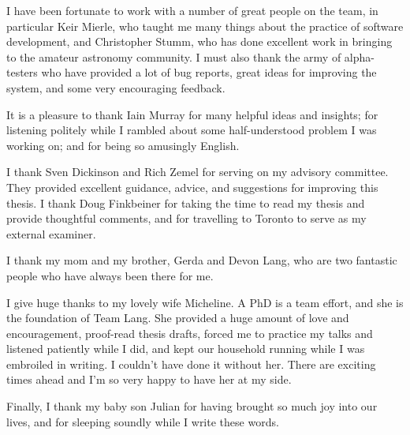\documentclass[letterpaper]{ut-thesis}
\begin{document}
\begin{preliminary}
\begin{acknowledgements}
I have been fortunate to work with a number of great people on the \an
team, in particular Keir Mierle, who taught me many things about the
practice of software development, and Christopher Stumm, who has done
excellent work in bringing \an to the amateur astronomy community.
I must also thank the army of alpha-testers who have provided a lot of
bug reports, great ideas for improving the system, and some very
encouraging feedback.




It is a pleasure to thank Iain Murray for many helpful ideas and
insights; for listening politely while I rambled about some
half-understood problem I was working on; and for being so amusingly
English.


I thank Sven Dickinson and Rich Zemel for serving on my advisory
committee.  They provided excellent guidance, advice, and suggestions
for improving this thesis.  I thank Doug Finkbeiner for taking the
time to read my thesis and provide thoughtful comments, and for
travelling to Toronto to serve as my external examiner.


I thank my mom and my brother, Gerda and Devon Lang, who are two
fantastic people who have always been there for me.


I give huge thanks to my lovely wife Micheline.  A PhD is a
team effort, and she is the foundation of Team Lang.  She provided a
huge amount of love and encouragement, proof-read thesis drafts,
forced me to practice my talks and listened patiently while I did, and
kept our household running while I was embroiled in writing.  I
couldn't have done it without her.  There are exciting times ahead and
I'm so very happy to have her at my side.

Finally, I thank my baby son Julian
for having brought so much joy into our lives, and
for sleeping soundly while I write these words.

\end{acknowledgements}

\tableofcontents


\end{preliminary}
\end{document}
